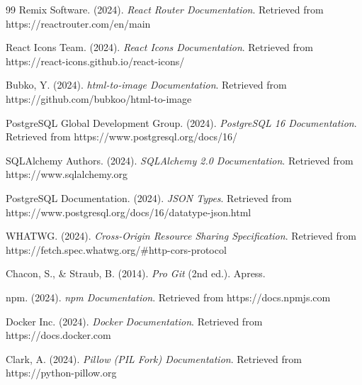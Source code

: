 \begin{thebibliography}{99}
Remix Software. (2024). \textit{React Router Documentation}. Retrieved from https://reactrouter.com/en/main

React Icons Team. (2024). \textit{React Icons Documentation}. Retrieved from https://react-icons.github.io/react-icons/

Bubko, Y. (2024). \textit{html-to-image Documentation}. Retrieved from https://github.com/bubkoo/html-to-image

PostgreSQL Global Development Group. (2024). \textit{PostgreSQL 16 Documentation}. Retrieved from https://www.postgresql.org/docs/16/

SQLAlchemy Authors. (2024). \textit{SQLAlchemy 2.0 Documentation}. Retrieved from https://www.sqlalchemy.org

PostgreSQL Documentation. (2024). \textit{JSON Types}. Retrieved from https://www.postgresql.org/docs/16/datatype-json.html

WHATWG. (2024). \textit{Cross-Origin Resource Sharing Specification}. Retrieved from https://fetch.spec.whatwg.org/\#http-cors-protocol

Chacon, S., \& Straub, B. (2014). \textit{Pro Git} (2nd ed.). Apress.


npm. (2024). \textit{npm Documentation}. Retrieved from https://docs.npmjs.com

Docker Inc. (2024). \textit{Docker Documentation}. Retrieved from https://docs.docker.com

Clark, A. (2024). \textit{Pillow (PIL Fork) Documentation}. Retrieved from https://python-pillow.org

\end{thebibliography}
